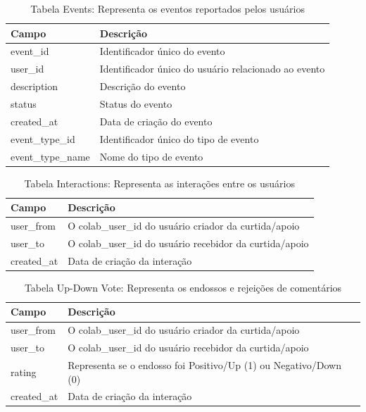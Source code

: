 \begin{table}[ht]
	\centering
	\caption{Tabela Events: Representa os eventos reportados pelos usuários}
	\label{tab:event_model}
	\begin{tabularx}{\textwidth}{|l|X|}
		\hline
		\textbf{Campo}    & \textbf{Descrição}                                   \\
		\hline
		event\_id         & Identificador único do evento                        \\
		user\_id          & Identificador único do usuário relacionado ao evento \\
		description       & Descrição do evento                                  \\
		status            & Status do evento                                     \\
		created\_at       & Data de criação do evento                            \\
		event\_type\_id   & Identificador único do tipo de evento                \\
		event\_type\_name & Nome do tipo de evento                               \\
		\hline
	\end{tabularx}
\end{table}

\begin{table}[ht]
	\centering
	\caption{Tabela Interactions: Representa as interações entre os usuários}
	\label{tab:interactions_model}
	\begin{tabularx}{\textwidth}{|l|X|}
		\hline
		\textbf{Campo} & \textbf{Descrição}                                      \\
		\hline
		user\_from     & O colab\_user\_id do usuário criador da curtida/apoio   \\
		user\_to       & O colab\_user\_id do usuário recebidor da curtida/apoio \\
		created\_at    & Data de criação da interação                            \\
		\hline
	\end{tabularx}
\end{table}

\begin{table}[ht]
	\centering
	\caption{Tabela Up-Down Vote: Representa os endossos e rejeições de comentários}
	\label{tab:updown_model}
	\begin{tabularx}{\textwidth}{|l|X|}
		\hline
		\textbf{Campo} & \textbf{Descrição}                                               \\
		\hline
		user\_from     & O colab\_user\_id do usuário criador da curtida/apoio            \\
		user\_to       & O colab\_user\_id do usuário recebidor da curtida/apoio          \\
		rating         & Representa se o endosso foi Positivo/Up (1) ou Negativo/Down (0) \\
		created\_at    & Data de criação da interação                                     \\
		\hline
	\end{tabularx}
\end{table}

